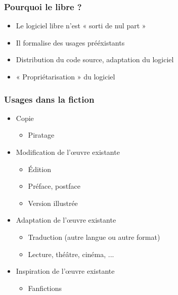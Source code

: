 \documentclass[11pt]{beamer}
\begin{document}
\begin{frame}
  \frametitle{Pourquoi le libre ?}
  \begin{itemize}
  \item Le logiciel libre n'est « sorti de nul part »
  \item Il formalise des usages prééxistants
  \item Distribution du code source, adaptation du logiciel
  \item « Propriétarisation » du logiciel
  \end{itemize}
\end{frame}

\begin{frame}
  \frametitle{Usages dans la fiction}
    \begin{itemize}
    \item Copie
      \begin{itemize}
      \item Piratage
      \end{itemize}
    \item Modification de l'œuvre existante
      \begin{itemize}
      \item Édition
      \item Préface, postface
      \item Version illustrée
      \end{itemize}
    \item Adaptation de l'œuvre existante
      \begin{itemize}
      \item Traduction (autre langue ou autre format)
      \item Lecture, théâtre, cinéma, ...
      \end{itemize}
    \item Inspiration de l'œuvre existante
      \begin{itemize}
      \item Fanfictions
      \end{itemize}
  \end{itemize}
\end{frame}
\end{document}
